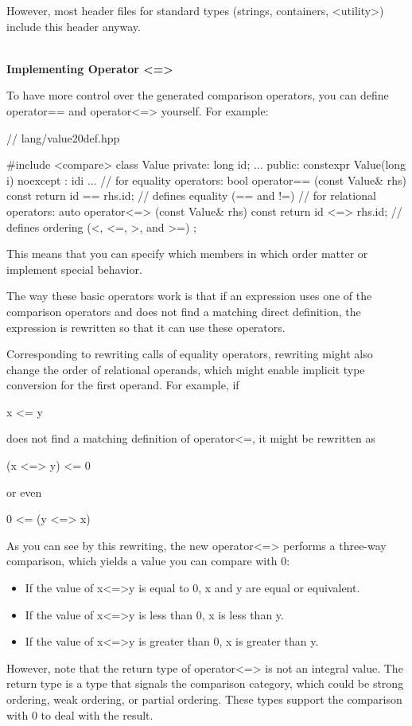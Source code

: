However, most header files for standard types (strings, containers, <utility>) include this header anyway.

\noindent
\hspace*{\fill} \\ %
\textbf{Implementing Operator <=>}

To have more control over the generated comparison operators, you can define operator== and operator<=> yourself. For example:

\begin{cpp}
// lang/value20def.hpp

#include <compare>
class Value {
private:
	long id;
	...
public:
	constexpr Value(long i) noexcept
	: id{i} {
	}
	...
	// for equality operators:
	bool operator== (const Value& rhs) const {
		return id == rhs.id; // defines equality (== and !=)
	}
	// for relational operators:
	auto operator<=> (const Value& rhs) const {
		return id <=> rhs.id; // defines ordering (<, <=, >, and >=)
	}
};
\end{cpp}

This means that you can specify which members in which order matter or implement special behavior.

The way these basic operators work is that if an expression uses one of the comparison operators and does not find a matching direct definition, the expression is rewritten so that it can use these operators.

Corresponding to rewriting calls of equality operators, rewriting might also change the order of relational operands, which might enable implicit type conversion for the first operand. For example, if

\begin{cpp}
x <= y
\end{cpp}

does not find a matching definition of operator<=, it might be rewritten as

\begin{cpp}
(x <=> y) <= 0
\end{cpp}

or even

\begin{cpp}
0 <= (y <=> x)
\end{cpp}

As you can see by this rewriting, the new operator<=> performs a three-way comparison, which yields a value you can compare with 0:

\begin{itemize}
\item
If the value of x<=>y is equal to 0, x and y are equal or equivalent.

\item
If the value of x<=>y is less than 0, x is less than y.

\item
If the value of x<=>y is greater than 0, x is greater than y.
\end{itemize}

However, note that the return type of operator<=> is not an integral value. The return type is a type that signals the comparison category, which could be strong ordering, weak ordering, or partial ordering. These types support the comparison with 0 to deal with the result.










